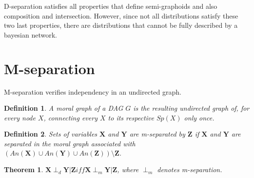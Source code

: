 \documentclass{amsart}
\theoremstyle{plain}
\newtheorem*{definition}{Definition}
\newtheorem{theorem}{Theorem}
\begin{document}
D-separation satisfies all properties that define semi-graphoids and also composition and
intersection. However, since not all distributions satisfy these two last properties, there are
distributions that cannot be fully described by a bayesian network.

\section{M-separation}

M-separation verifies independency in an undirected graph.

\begin{definition}
  A moral graph of a DAG $G$ is the resulting undirected graph of, for every node $X$, connecting
  every $X$ to its respective $Sp(X)$ only once.
\end{definition}

\begin{definition}
  Sets of variables $\mathbf{X}$ and $\mathbf{Y}$ are m-separated by $\mathbf{Z}$ if $\mathbf{X}$
  and $\mathbf{Y}$ are separated in the moral graph associated with $(An(\mathbf{X})\cup
  An(\mathbf{Y})\cup An(\mathbf{Z}))\setminus \mathbf{Z}$.
\end{definition}

\begin{theorem}
  $\mathbf{X}\perp_d\mathbf{Y}|\mathbf{Z} iff \mathbf{X}\perp_m\mathbf{Y}|\mathbf{Z}$, where
  $\perp_m$ denotes m-separation.
\end{theorem}

\newpage

\printbibliography[]
\end{document}

